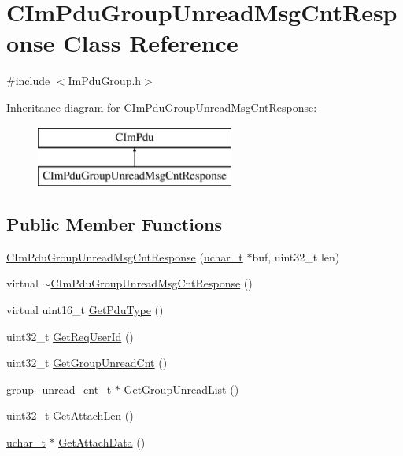 \hypertarget{class_c_im_pdu_group_unread_msg_cnt_response}{}\section{C\+Im\+Pdu\+Group\+Unread\+Msg\+Cnt\+Response Class Reference}
\label{class_c_im_pdu_group_unread_msg_cnt_response}


{\ttfamily \#include $<$Im\+Pdu\+Group.\+h$>$}

Inheritance diagram for C\+Im\+Pdu\+Group\+Unread\+Msg\+Cnt\+Response\+:\begin{figure}[H]
\begin{center}
\leavevmode
\includegraphics[height=2.000000cm]{class_c_im_pdu_group_unread_msg_cnt_response}
\end{center}
\end{figure}
\subsection*{Public Member Functions}
\begin{DoxyCompactItemize}
\item 
\hyperlink{class_c_im_pdu_group_unread_msg_cnt_response_a3b136097918b0907bc6bd2ecfd502631}{C\+Im\+Pdu\+Group\+Unread\+Msg\+Cnt\+Response} (\hyperlink{base_2ostype_8h_a124ea0f8f4a23a0a286b5582137f0b8d}{uchar\+\_\+t} $\ast$buf, uint32\+\_\+t len)
\item 
virtual \hyperlink{class_c_im_pdu_group_unread_msg_cnt_response_a70fd56a21f1db4bfc0b571ca69c63335}{$\sim$\+C\+Im\+Pdu\+Group\+Unread\+Msg\+Cnt\+Response} ()
\item 
virtual uint16\+\_\+t \hyperlink{class_c_im_pdu_group_unread_msg_cnt_response_a053189f956b5fcc1d61e37f914fb4124}{Get\+Pdu\+Type} ()
\item 
uint32\+\_\+t \hyperlink{class_c_im_pdu_group_unread_msg_cnt_response_a15467203f15396f244d0bb70a54fd2da}{Get\+Req\+User\+Id} ()
\item 
uint32\+\_\+t \hyperlink{class_c_im_pdu_group_unread_msg_cnt_response_a46ef5ff900cf07329de911034a273fd4}{Get\+Group\+Unread\+Cnt} ()
\item 
\hyperlink{structgroup__unread__cnt__t}{group\+\_\+unread\+\_\+cnt\+\_\+t} $\ast$ \hyperlink{class_c_im_pdu_group_unread_msg_cnt_response_a11d52400bec19b51fd937594de971d26}{Get\+Group\+Unread\+List} ()
\item 
uint32\+\_\+t \hyperlink{class_c_im_pdu_group_unread_msg_cnt_response_aca02e6a844e15bb3425971d57f86afea}{Get\+Attach\+Len} ()
\item 
\hyperlink{base_2ostype_8h_a124ea0f8f4a23a0a286b5582137f0b8d}{uchar\+\_\+t} $\ast$ \hyperlink{class_c_im_pdu_group_unread_msg_cnt_response_a983248d2bcd6105c9ae2c3aa14eec222}{Get\+Attach\+Data} ()
\end{DoxyCompactItemize}
